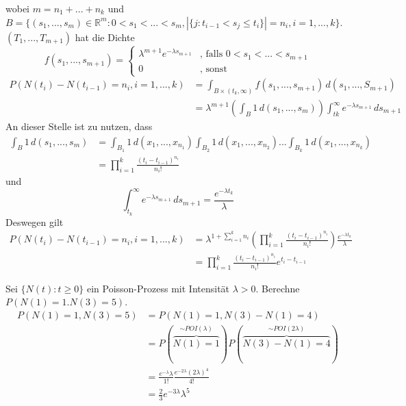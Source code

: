 \documentclass[a4paper,12pt]{article}
\begin{document}
wobei 
$m = n_1 + ... + n_k$ und $B = \{(s_1, ..., s_m)\in \mathbb{R}^m:
0 < s_1 < ... < s_m, |\{j:t_{i-1}<s_j\leq t_i\}     | = n_i, 
i=1, ..., k
\}$. $(T_1, ..., T_{m+1})$ hat die Dichte
$$
f(s_1, ..., s_{m+1}) = 
\begin{cases}
\lambda^{m+1}e^{-\lambda s_{m+1}} & \text{, falls } 0 < s_1 < ... < s_{m+1}\\
0 & \text{, sonst}
\end{cases}
$$
\begin{align*}
P(N(t_i) - N(t_{i-1}) = n_i , i = 1, ..., k) & =
\int_{B \times (t_k, \infty)}f(s_1, ..., s_{m+1}) \, d(s_1, ..., S_{m+1}) \\
& = \lambda^{m+1}\left(
\int_{B}1 \, d(s_1, ..., s_m)\right)\int_{tk}^{\infty}e^{-\lambda s_{m+1}} \, d s_{m+1}
\end{align*}
An dieser Stelle ist zu nutzen, dass
\begin{align*}
\int_{B} 1 \, d(s_1, ..., s_m) & = \int_{B_1}1 \, d(x_1, ..., x_{n_1}) \int_{B_2}1 \, d(x_1, ..., x_{n_2}) ... \int_{B_k}1 \, d(x_1, ..., x_{n_k})\\
& = \prod_{i=1}^{k}\frac{(t_i - t_{i-1})^{n_i}}{n_i!}  
\end{align*}
und
$$
\int_{t_k}^{\infty}e^{-\lambda s_{m+1}} \, d s_{m+1} = \frac{e^{-\lambda t_k}}{\lambda}
$$
Deswegen gilt
\begin{align*}
P(N(t_i) - N(t_{i-1}) = n_i , i = 1, ..., k) & = 
\lambda^{1 + \sum_{i=1}^{k}n_i}\left(  \prod_{i=1}^{k}\frac{(t_i - t_{i-1})^{n_i}}{n_i!}     \right) \frac{e^{-\lambda t_k}}{\lambda} \\
& =  \prod_{i=1}^{k}\frac{(t_i - t_{i-1})^{n_i}}{n_i!} e^{t_i - t_{i-1}}
\end{align*}

\begin{tcolorbox}[breakable, colframe=blue, colback=white, title=Beispiel 19]
Sei $\{N(t):t \geq 0\}$ ein Poisson-Prozess mit Intensität $\lambda > 0$.
Berechne $P(N(1)= 1. N(3) = 5)$.
\begin{align*}
P(N(1) = 1, N(3)=5) & = P(N(1) = 1, N(3) - N(1) = 4) \\
& = P (  \overbrace{N(1)=1}^{\sim POI(\lambda)}   )P (  \overbrace{N(3)-N(1)=4}^{\sim POI(2\lambda)}   )\\
& = \frac{e^{-\lambda}\lambda}{1!} \frac{e^{-2\lambda}(2\lambda)^4}{4!} \\
& = \frac{2}{3}e^{-3 \lambda}\lambda^5
\end{align*}
\end{tcolorbox}
\end{document}
